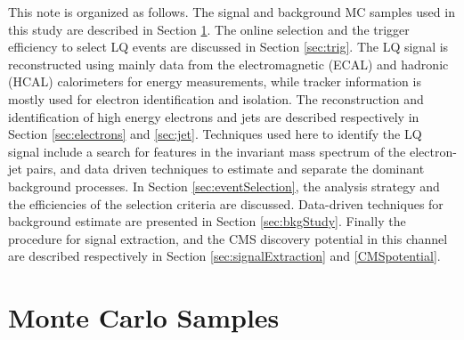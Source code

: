\documentclass[colclass=cmspaper]{combine}
\begin{document}
\begin{linenumbers}
This note is organized as follows. 
The signal and background MC samples used in this study are described in Section \ref{sec:MCSamples}.
The online selection and the trigger efficiency to select LQ events are discussed in Section \ref{sec:trig}.
The LQ signal is reconstructed using mainly data from the
electromagnetic (ECAL) and hadronic (HCAL) calorimeters for energy measurements, while tracker information 
is mostly used for electron identification and isolation. 
The reconstruction and identification of high energy electrons and jets are described respectively 
in Section \ref{sec:electrons} and \ref{sec:jet}.
Techniques used here to identify the LQ signal include a search for features in the invariant mass
spectrum of the electron-jet pairs, and data driven techniques to estimate 
and separate the dominant background processes.
In Section \ref{sec:eventSelection}, the analysis strategy and the efficiencies of the selection criteria 
are discussed. Data-driven techniques for background estimate are presented in Section \ref{sec:bkgStudy}.
Finally the procedure for signal extraction, and the CMS discovery potential in this channel are described
respectively in Section \ref{sec:signalExtraction} and \ref{CMSpotential}.



\section{Monte Carlo Samples} \label{sec:MCSamples}



\end{linenumbers}
\end{document}
